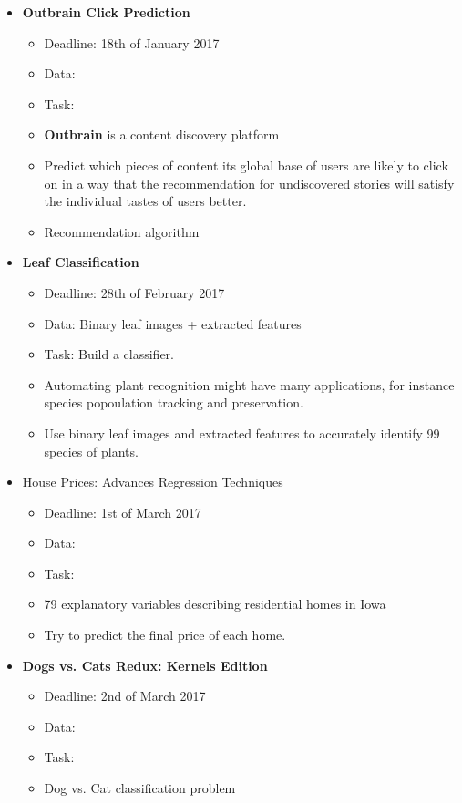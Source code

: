 \documentclass[a4paper,11pt]{article}
\theoremstyle{mytheor}
\begin{document}
\begin{itemize}[noitemsep]
\item \textbf{Outbrain Click Prediction}
\begin{itemize}[noitemsep]
  \item Deadline: 18th of January 2017
  \item Data:
  \item Task:
  \item \textbf{Outbrain} is a content discovery platform
  \item Predict which pieces of content its global base of users are likely to click on in a way that the 
  recommendation for undiscovered stories will satisfy the individual tastes of users better. 
  \item Recommendation algorithm
\end{itemize}
\item \textbf{Leaf Classification}
\begin{itemize}[noitemsep]
  \item Deadline: 28th of February 2017
  \item Data: Binary leaf images + extracted features
  \item Task: Build a classifier.
  \item Automating plant recognition might have many applications, for instance species popoulation tracking and 
  preservation.
  \item Use binary leaf images and extracted features to accurately identify 99 species of plants.
\end{itemize}
\item House Prices: Advances Regression Techniques
\begin{itemize}[noitemsep]
  \item Deadline: 1st of March 2017
  \item Data:
  \item Task:
  \item 79 explanatory variables describing residential homes in Iowa
  \item Try to predict the final price of each home.
\end{itemize}
\item \textbf{Dogs vs. Cats Redux: Kernels Edition}
\begin{itemize}[noitemsep]
  \item Deadline: 2nd of March 2017
  \item Data:
  \item Task:
  \item Dog vs. Cat classification problem

\end{itemize}
\end{itemize}
\end{document}
